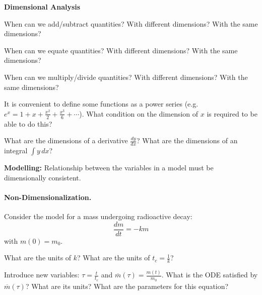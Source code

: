 
\begin{slide}

\question 

\textbf{Dimensional Analysis}


\begin{parts}

\item When can we add/subtract quantities? With different dimensions? With the same dimensions?

\item When can we equate quantities? With different dimensions? With the same dimensions?

\item When can we multiply/divide quantities? With different dimensions? With the same dimensions?

\item It is convenient to define some functions as a power series (e.g. $e^x = 1 + x + \frac{x^2}{2} + \frac{x^3}{6}+ \cdots$). What condition on the dimension of $x$ is required to be able to do this?

\item What are the dimensions of a derivative $\frac{dy}{dx}$? What are the dimensions of an integral $\int y \, dx$?
	
\end{parts}

\begin{slidesonly}
	\bigskip
\end{slidesonly}


\textbf{Modelling:} Relationship between the variables in a model must be dimensionally consistent.

\end{slide}




\begin{slide}

\question \label{q:radioactive}

\paragraph{Non-Dimensionalization.}

Consider the model for a mass undergoing radioactive decay:
\[ \frac{dm}{dt} = -km \]
with $m(0) = m_0$.

\begin{parts}
	\item What are the units of $k$? What are the units of $t_c=\frac{1}{k}$? %

	\item Introduce new variables: $\tau = \frac{t}{t_c}$ and $\overline{m}(\tau) = \frac{m(t)}{m_0}$. What is the ODE satisfied by $\overline{m}(\tau)$? What are its units? What are the parameters for this equation?
	
\end{parts}

\end{slide}




